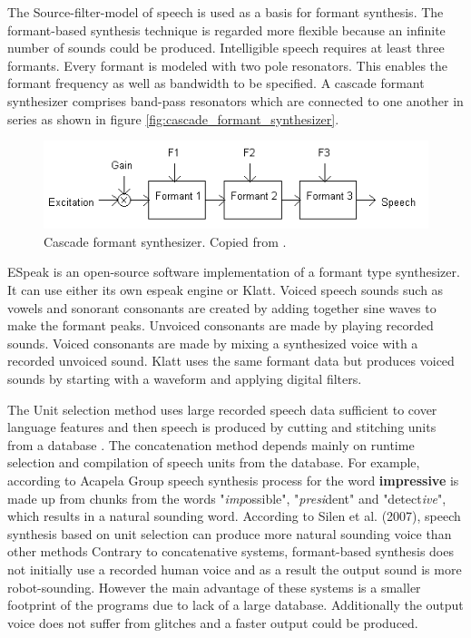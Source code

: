 \documentclass[11pt,a4paper,oneside,article]{memoir}
\begin{document}
The Source-filter-model of speech is used as a basis for formant synthesis. The formant-based synthesis technique is regarded more flexible because an infinite number of sounds could be produced. Intelligible speech requires at least three formants. Every formant is modeled with two pole resonators. This enables the formant frequency as well as bandwidth to be specified. A cascade formant synthesizer comprises band-pass resonators which are connected to one another in series \cite{hut} as shown in figure \vref{fig:cascade_formant_synthesizer}.

\begin{figure}[h]
  \centering
  \includegraphics[width=15cm]{cascade_formant_synthesizer}
  \caption{Cascade formant synthesizer. Copied from \cite{hut}.}
  \label{fig:cascade_formant_synthesizer}
\end{figure}


ESpeak is an open-source software implementation of a formant type synthesizer. It can use either its own espeak engine or Klatt. Voiced speech sounds such as vowels and sonorant consonants are created by adding together sine waves to make the formant peaks. Unvoiced consonants are made by playing recorded sounds. Voiced consonants are made by mixing a synthesized voice with a recorded unvoiced sound. Klatt uses the same formant data but produces voiced sounds by starting with a waveform and applying digital filters. \cite{espeak}

The Unit selection method uses large recorded speech data sufficient to cover language features and then speech is produced by cutting and stitching units from a database \cite{chala}. The concatenation method depends mainly on runtime selection and compilation of speech units from the database. For example, according to Acapela Group speech synthesis process for the word \textbf{impressive} is made up from chunks from the words "\emph{imp}ossible", "\emph{presi}dent" and "detect\emph{ive}", which results in a natural sounding word.
According to Silen et al. (2007), speech synthesis based on unit selection can produce more natural sounding voice than other methods \cite[1]{silen} 
Contrary to concatenative systems, formant-based synthesis does not initially use a recorded human voice and as a result the output sound is more robot-sounding. However the main advantage of these systems is a smaller footprint of the programs due to lack of a large database. Additionally the output voice does not suffer from glitches and a faster output could be produced. \cite{allen}
\end{document}
